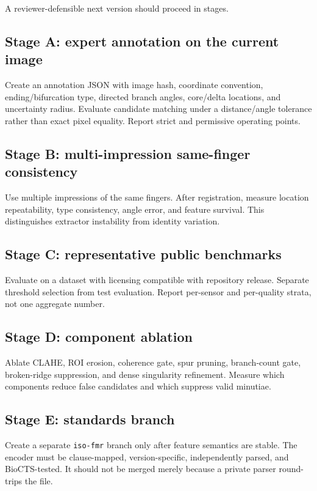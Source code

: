 \documentclass[11pt]{article}
\begin{document}
A reviewer-defensible next version should proceed in stages.

\subsection{Stage A: expert annotation on the current image}

Create an annotation JSON with image hash, coordinate convention, ending/bifurcation type, directed branch angles, core/delta locations, and uncertainty radius. Evaluate candidate matching under a distance/angle tolerance rather than exact pixel equality. Report strict and permissive operating points.

\subsection{Stage B: multi-impression same-finger consistency}

Use multiple impressions of the same fingers. After registration, measure location repeatability, type consistency, angle error, and feature survival. This distinguishes extractor instability from identity variation.

\subsection{Stage C: representative public benchmarks}

Evaluate on a dataset with licensing compatible with repository release. Separate threshold selection from test evaluation. Report per-sensor and per-quality strata, not one aggregate number.

\subsection{Stage D: component ablation}

Ablate CLAHE, ROI erosion, coherence gate, spur pruning, branch-count gate, broken-ridge suppression, and dense singularity refinement. Measure which components reduce false candidates and which suppress valid minutiae.

\subsection{Stage E: standards branch}

Create a separate \texttt{iso-fmr} branch only after feature semantics are stable. The encoder must be clause-mapped, version-specific, independently parsed, and BioCTS-tested. It should not be merged merely because a private parser round-trips the file.
\end{document}
